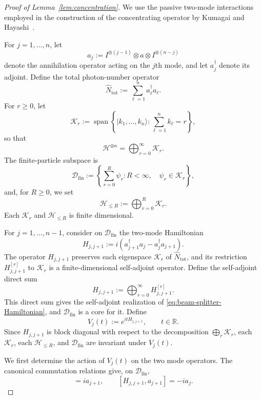 \documentclass{article}
\theoremstyle{named}
\theoremstyle{named1}
\newcommand{\cH}{\mathcal H}
\theoremstyle{plain}
\theoremstyle{remark}
\begin{document}
\begin{proof}[Proof of Lemma~\ref{lem:concentration}]
We use the passive two-mode interactions employed in the construction of
the concentrating operator by Kumagai and
Hayashi~\cite[Section~2]{KumagaiHayashi2013}.

For $j=1,\ldots,n$, let
\[
    a_j
    :=
    I^{\otimes(j-1)}
    \otimes a
    \otimes I^{\otimes(n-j)}
\]
denote the annihilation operator acting on the $j$th mode, and let
$a_j^\dagger$ denote its adjoint.  Define the total photon-number operator
\[
    \widehat N_{\mathrm{tot}}
    :=
    \sum_{\ell=1}^n a_\ell^\dagger a_\ell .
\]
For $r\geq0$, let
\[
    \mathcal K_r
    :=
    \operatorname{span}
    \left\{
        |k_1,\ldots,k_n\rangle:
        \sum_{\ell=1}^n k_\ell=r
    \right\},
\]
so that
\[
    \cH^{\otimes n}
    =
    \bigoplus_{r=0}^\infty\mathcal K_r .
\]
The finite-particle subspace is
\[
    \mathscr D_{\mathrm{fin}}
    :=
    \left\{
        \sum_{r=0}^{R}\psi_r:
        R<\infty,\quad
        \psi_r\in\mathcal K_r
    \right\},
\]
and, for $R\geq0$, we set
\[
    \cH_{\leq R}
    :=
    \bigoplus_{r=0}^{R}\mathcal K_r .
\]
Each $\mathcal K_r$ and $\cH_{\leq R}$ is finite dimensional.

For $j=1,\ldots,n-1$, consider on
$\mathscr D_{\mathrm{fin}}$ the two-mode Hamiltonian
\begin{equation}
    H_{j,j+1}
    :=
    i\left(
        a_{j+1}^\dagger a_j
        -
        a_j^\dagger a_{j+1}
    \right).
    \label{eq:beam-splitter-Hamiltonian}
\end{equation}
The operator $H_{j,j+1}$ preserves each eigenspace
$\mathcal K_r$ of $\widehat N_{\mathrm{tot}}$, and its restriction
$H_{j,j+1}^{[r]}$ to $\mathcal K_r$ is a finite-dimensional
self-adjoint operator. Define the self-adjoint direct sum
\[
H_{j,j+1}
:=
\bigoplus_{r=0}^{\infty}H_{j,j+1}^{[r]}.
\]
This direct sum gives the self-adjoint realization of
\eqref{eq:beam-splitter-Hamiltonian}, and
$\mathscr D_{\mathrm{fin}}$ is a core for it.
Define 
\begin{equation}
    V_j(t)
    :=
    e^{itH_{j,j+1}},
    \qquad t\in\mathbb R .
    \label{eq:beam-splitter-unitary}
\end{equation}
Since $H_{j,j+1}$ is block diagonal with respect to the decomposition
$\bigoplus_r\mathcal K_r$, each $\mathcal K_r$, each
$\cH_{\leq R}$, and $\mathscr D_{\mathrm{fin}}$ are invariant under
$V_j(t)$.

We first determine the action of $V_j(t)$ on the two mode operators.
The canonical commutation relations give, on
$\mathscr D_{\mathrm{fin}}$,
\begin{equation}
    [H_{j,j+1},a_j]
    =
    ia_{j+1},
    \qquad
    [H_{j,j+1},a_{j+1}]
    =
    -ia_j.
    \label{eq:beam-splitter-commutators}
\end{equation}


\end{proof}
\end{document}
